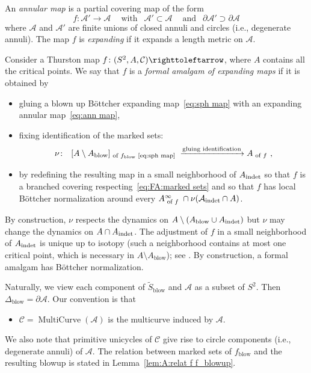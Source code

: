 \documentclass{amsart}
\theoremstyle{plain}
\theoremstyle{definition}
\theoremstyle{remark}
\renewcommand{\AA}{{\mathcal A}}
\newcommand{\blowup}{{\operatorname{blow}}}
\renewcommand{\sp}{{\ \ }}
\newcommand{\CC}{{\mathcal C}}
\newcommand{\MC}{{\operatorname{MultiCurve}}}
\newcommand\selfmap{\righttoleftarrow}
\begin{document}
An \emph{annular map} is a partial covering map of the form
\begin{equation}
\label{eq:ann map}
f\colon \AA'\to \AA\sp\sp \text{ with }\sp \AA'\subset \AA \sp\sp\text{ and }\sp\partial \AA'\supset \partial \AA
\end{equation}
where $\AA $ and $\AA'$ are finite unions of closed annuli and circles (i.e., degenerate annuli). The map $f$ is \emph{expanding} if it expands a length metric on $\AA$.

Consider a Thurston map $f\colon (S^2,A,\CC)\selfmap$, where $A$ contains all the critical points. We say that $f$ is a \emph{formal amalgam of expanding maps} if it is obtained by
\begin{itemize}
 \item gluing a blown up B\"ottcher expanding  map~\eqref{eq:sph map} with an expanding annular map~\eqref{eq:ann map}, 

 \item fixing identification of the marked sets:
 \begin{equation}
 \label{eq:FA:marked sets}
   \nu\colon \sp [A\setminus  A_\blowup]_{\text{ of $f_\blowup$ \eqref{eq:sph map} }}  \xrightarrow{\text{gluing identification}} A _{\text{ of $f$}} \ ,
 \end{equation}
 \item by redefining the resulting map in a small neighborhood of  $A_{\operatorname{indet}}$ so that $f$ is a branched covering respecting~\eqref{eq:FA:marked sets} and so that $f$ has local B\"ottcher normalization around every $A^\infty_\text{ of $f$ }\cap \nu(\AA_\indet\cap A)$.
\end{itemize}
By construction, $\nu$ respects the dynamics on $A\setminus (A_\blowup\cup A_\indet)$ but $\nu$ may change the dynamics on $A\cap A_{\operatorname{indet}}$. The adjustment of $f$ in a small neighborhood of $A_{\operatorname{indet}}$ is unique up to isotopy  (such a neighborhood contains at most one critical point, which is necessary in $A\setminus A_\blowup$); see \cite[\S4]{Pilgrim_Comb}. By construction, a formal amalgam has B\"ottcher normalization. 
 
 Naturally, we view each component of $\widetilde S_\blowup$ and $\AA$ as a subset of $S^2$. Then $\Delta_\blowup = \partial \AA$. Our convention is that 
\begin{itemize}
    \item $\CC=\MC(\AA)$ is the multicurve induced by $\AA$.
\end{itemize}
We also note that primitive unicycles of $\CC$ give rise to circle components (i.e., degenerate annuli) of $\AA$. The relation between marked sets of $f_\blowup$ and the resulting blowup is stated in Lemma~\ref{lem:A:relat f f_blowup}. 
\end{document}
